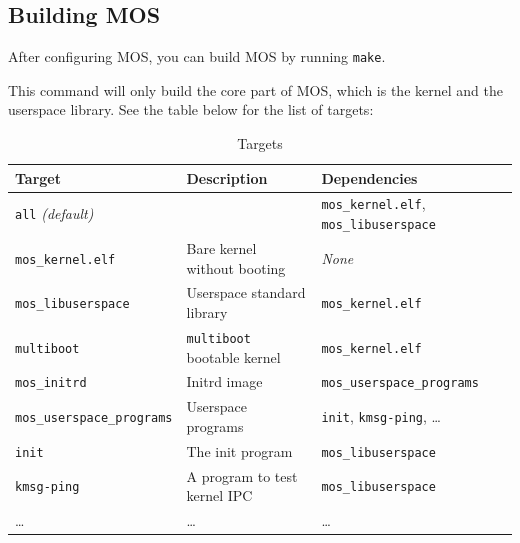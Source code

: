 \subsection{Building MOS}

After configuring MOS, you can build MOS by running \texttt{make}.

This command will only build the core part of MOS, which is the kernel and the userspace library.
See the table below for the list of targets:

\begin{table}[h]
    \centering
    \small
    \begin{tabular}{|l|l|l|}
        \hline
        \textbf{Target}                   & \textbf{Description}               & \textbf{Dependencies}                                \\ \hline
        \texttt{all} \textit{(default)}   &                                    & \texttt{mos\_kernel.elf}, \texttt{mos\_libuserspace} \\ \hline
        \texttt{mos\_kernel.elf}          & Bare kernel without booting        & \textit{None}                                        \\ \hline
        \texttt{mos\_libuserspace}        & Userspace standard library         & \texttt{mos\_kernel.elf}                             \\ \hline
        \texttt{multiboot}                & \texttt{multiboot} bootable kernel & \texttt{mos\_kernel.elf}                             \\ \hline
        \texttt{mos\_initrd}              & Initrd image                       & \texttt{mos\_userspace\_programs}                    \\ \hline
        \texttt{mos\_userspace\_programs} & Userspace programs                 & \texttt{init}, \texttt{kmsg-ping}, \dots             \\ \hline
        \texttt{init}                     & The init program                   & \texttt{mos\_libuserspace}                           \\ \hline
        \texttt{kmsg-ping}                & A program to test kernel IPC       & \texttt{mos\_libuserspace}                           \\ \hline
        \dots                             & \dots                              & \dots                                                \\ \hline
    \end{tabular}
    \caption{Targets}
    \label{tab:targets}
\end{table}

